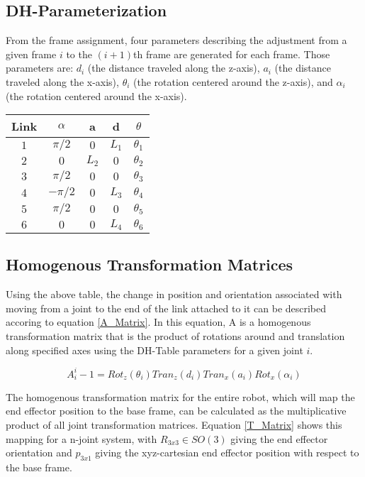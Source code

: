 \documentclass[10pt,journal]{IEEEtran}
\begin{document}
\subsection{DH-Parameterization}
From the frame assignment, four parameters describing the adjustment from a given frame $i$ to the $(i+1)$th frame are generated for each frame. Those parameters are: $d_i$ (the distance traveled along the z-axis), $a_i$ (the distance traveled along the x-axis), $\theta_i$ (the rotation centered around the z-axis), and $\alpha_i$ (the rotation centered around the x-axis).
\begin{center}
\begin{tabular}{ | c | c | c | c | c | } 
		\hline
		Link   & $\alpha$ & a     & d     & $\theta$   \\
\hline\hline
		$1$    & $\pi/2$  & $0$   & $L_1$ & $\theta_1$ \\
\hline
		$2$    & $0$      & $L_2$ & $0$   & $\theta_2$ \\
\hline
		$3$    & $\pi/2$  & $0$   & $0$   & $\theta_3$ \\
\hline
		$4$    & $-\pi/2$ & $0$   & $L_3$ & $\theta_4$ \\
\hline
		$5$    & $\pi/2$  & $0$   & $0$   & $\theta_5$ \\
\hline
		$6$    & $0$      & $0$   & $L_4$ & $\theta_6$ \\
		\hline
	\end{tabular}
\end{center}

\subsection{Homogenous Transformation Matrices}
Using the above table, the change in position and orientation
associated with moving from a joint to the end of the link
attached to it can be described accoring to equation \ref{A_Matrix}. In this
equation, A is a homogenous transformation matrix that is
the product of rotations around and translation along specified
axes using the DH-Table parameters for a given joint $i$.

\begin{equation}\label{A_Matrix}
	A_i^i-1=Rot_z(\theta_i)Tran_z(d_i)Tran_x(a_i)Rot_x(\alpha_i)
\end{equation}

The homogenous transformation matrix for the entire robot,
which will map the end effector position to the base frame,
can be calculated as the multiplicative product of all joint
transformation matrices. Equation \ref{T_Matrix} shows this mapping for
a n-joint system, with $R_{3x3} \in SO(3)$ giving the end effector orientation and $p_{3x1}$ giving the xyz-cartesian end effector position with respect to the base frame.
\end{document}
